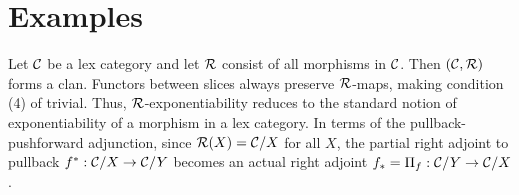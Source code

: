 \section{Examples} \label{sec:example}

\begin{example}
  Let $\mathcal{C}$ be a lex category
  and let $\mathcal{R}$ consist of all morphisms in $\mathcal{C}$.
  Then $(\mathcal{C},\mathcal{R})$ forms a clan.
  Functors between slices always preserve $\mathcal{R}$-maps,
  making condition (4) of  trivial.
  Thus, $\mathcal{R}$-exponentiability reduces to
  the standard notion of exponentiability of a morphism in a lex category.
  In terms of the pullback-pushforward adjunction,
  since $\mathcal{R}(X) = \mathcal{C} / X$ for all $X$,
  the partial right adjoint to pullback $f^* : \mathcal{C} / X \to \mathcal{C} / Y$ becomes
  an actual right adjoint $f_* = \Pi_f : \mathcal{C}/Y \to \mathcal{C}/X$.
\end{example}

